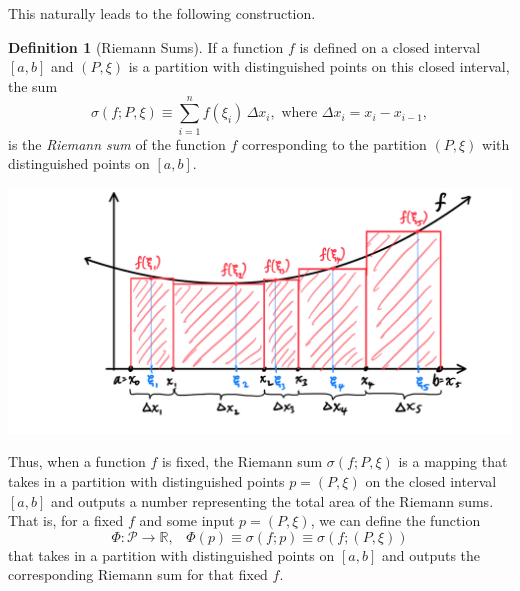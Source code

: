 \documentclass{article}
\theoremstyle{remark}
\theoremstyle{definition}
\newtheorem{definition}{Definition}[section]
\begin{document}
This naturally leads to the following construction. 

\begin{definition}[Riemann Sums]
If a function $f$ is defined on a closed interval $[a, b]$ and $(P, \xi)$ is a partition with distinguished points on this closed interval, the sum
\[\sigma(f; P, \xi) \equiv \sum_{i=1}^n f(\xi_i)\, \Delta x_i, \text{ where } \Delta x_i = x_i - x_{i-1},\]
is the \textit{Riemann sum} of the function $f$ corresponding to the partition $(P, \xi)$ with distinguished points on $[a, b]$. 
\begin{center}
    \includegraphics[scale=0.25]{img/Riemann_Sum_with_Partitions_Points.PNG}
\end{center}
Thus, when a function $f$ is fixed, the Riemann sum $\sigma (f; P, \xi)$ is a mapping that takes in a partition with distinguished points $p = (P, \xi)$ on the closed interval $[a, b]$ and outputs a number representing the total area of the Riemann sums. That is, for a fixed $f$ and some input $p = (P, \xi)$, we can define the function 
\[\Phi: \mathcal{P} \longrightarrow \mathbb{R}, \;\;\; \Phi(p) \equiv \sigma(f; p) \equiv \sigma(f; (P, \xi))\]
that takes in a partition with distinguished points on $[a,b]$ and outputs the corresponding Riemann sum for that fixed $f$. 
\end{definition}
\end{document}
